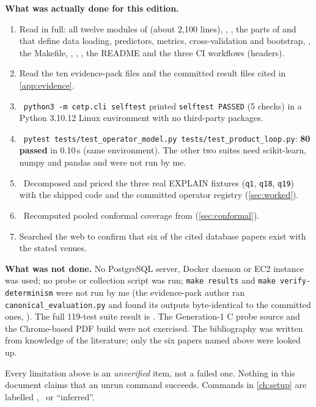 \textbf{What was actually done for this edition.}
\begin{enumerate}
\item Read in full: all twelve modules of  (about 2,100 lines), ,
  , the parts of 
  and  that define data loading, predictors, metrics, cross-validation and
  bootstrap, , the Makefile, ,
  , , the README and the three CI workflows (headers).
\item Read the ten evidence-pack files  and the committed result files cited in
  \cref{app:evidence}.
\item \evRUN\ \texttt{python3 -m cetp.cli selftest} printed \texttt{selftest PASSED} (5 checks) in a
  Python 3.10.12 Linux environment with no third-party packages.
\item \evRUN\ \texttt{pytest tests/test\_operator\_model.py tests/test\_product\_loop.py}: \textbf{80 passed}
  in 0.10\,s (same environment). The other two suites need scikit-learn, numpy and pandas and were not run by me.
\item \evRUN\ Decomposed and priced the three real EXPLAIN fixtures (\texttt{q1}, \texttt{q18}, \texttt{q19}) with the
  shipped code and the committed operator registry (\cref{sec:worked}).
\item \evRUN\ Recomputed pooled conformal coverage from  (\cref{sec:conformal}).
\item Searched the web to confirm that six of the cited database papers exist with the stated venues.
\end{enumerate}

\textbf{What was not done.} No PostgreSQL server, Docker daemon or EC2 instance was used; no probe or
collection script was run; \texttt{make results} and \texttt{make verify-determinism} were not run by me
(the evidence-pack author ran \texttt{canonical\_evaluation.py} and found its outputs byte-identical to the
committed ones, \evPACK). The full 119-test suite result is \evPACK. The Generation-1 C probe source and the
Chrome-based PDF build were not exercised. The bibliography was written from knowledge of the literature;
only the six papers named above were looked up.

\begin{honest}
Every limitation above is an \emph{unverified} item, not a failed one. Nothing in this document claims that
an unrun command succeeds. Commands in \cref{ch:setup} are labelled \evRUN, \evPACK\ or ``inferred''.
\end{honest}
